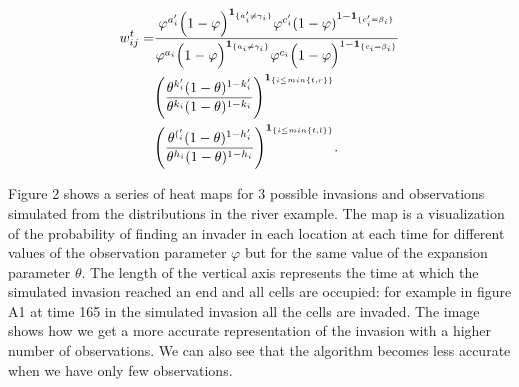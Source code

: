 \begin{align*}
    w_{ij}^t = & \frac{\varphi^{a'_i} \Big(1-\varphi \Big)^{\mathbf{1}_{\{a'_i \neq \gamma_i\}}} \varphi^{c'_i}(1-\varphi)^{1-\mathbf{1}_{\{c'_i = \beta_i\}}}}{\varphi^{a_i} \Big(1-\varphi \Big)^{\mathbf{1}_{\{a_i \neq \gamma_i\}}} \varphi^{c_i} \Big(1-\varphi \Big)^{1-\mathbf{1}_{\{c_i = \beta_i\}}}} \\ \nonumber
    & \Bigg(\frac{\theta^{k'_i} (1-\theta )^{1-k'_i} }{ \theta^{k_i} (1-\theta )^{1-k_i}} \Bigg)^{\mathbf{1}_{\{i \leq min\{ t, r\}\}} } \\ \nonumber
    & \Bigg( \frac{ \theta^{('_i} (1-\theta )^{1-h'_i} }{ \theta^{h_i} (1-\theta )^{1-h_i} } \Bigg)^{\mathbf{1}_{\{i \leq min\{ t, l\}\}}}.
\end{align*}

Figure 2 shows a series of heat maps for 3 possible invasions and observations simulated from the distributions in the river example. The map is a visualization of the probability of finding an invader in each location at each time for different values of the observation parameter $\varphi$ but for the same value of the expansion  parameter $\theta$. The length of the vertical axis represents the time at which the simulated invasion reached an end and all cells are occupied: for example in figure A1 at time 165 in the simulated invasion all the cells are invaded. The image shows how we get a more accurate representation of the invasion with a higher number of observations. We can also see that the algorithm becomes less accurate when we have only few observations.

